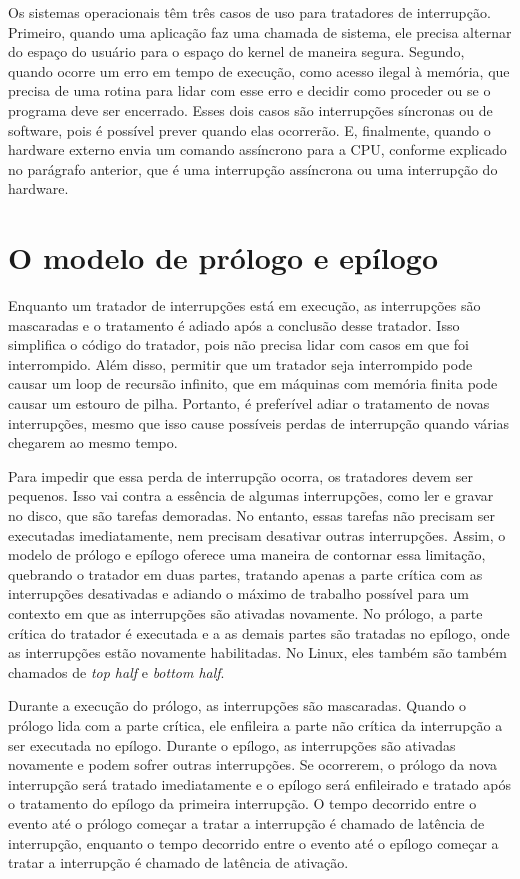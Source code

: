 Os sistemas operacionais têm três casos de uso para tratadores de interrupção. Primeiro, quando uma aplicação faz uma chamada de sistema, ele precisa alternar do espaço do usuário para o espaço do kernel de maneira segura. Segundo, quando ocorre um erro em tempo de execução, como acesso ilegal à memória, que precisa de uma rotina para lidar com esse erro e decidir como proceder ou se o programa deve ser encerrado. Esses dois casos são interrupções síncronas ou de software, pois é possível prever quando elas ocorrerão. E, finalmente, quando o hardware externo envia um comando assíncrono para a CPU, conforme explicado no parágrafo anterior, que é uma interrupção assíncrona ou uma interrupção do hardware. \cite{LinuxInterrupts}

\section{O modelo de prólogo e epílogo}

Enquanto um tratador de interrupções está em execução, as interrupções são mascaradas e o tratamento é adiado após a conclusão desse tratador. Isso simplifica o código do tratador, pois não precisa lidar com casos em que foi interrompido. Além disso, permitir que um tratador seja interrompido pode causar um loop de recursão infinito, que em máquinas com memória finita pode causar um estouro de pilha. Portanto, é preferível adiar o tratamento de novas interrupções, mesmo que isso cause possíveis perdas de interrupção quando várias chegarem ao mesmo tempo.

Para impedir que essa perda de interrupção ocorra, os tratadores devem ser pequenos. Isso vai contra a essência de algumas interrupções, como ler e gravar no disco, que são tarefas demoradas. No entanto, essas tarefas não precisam ser executadas imediatamente, nem precisam desativar outras interrupções. Assim, o modelo de prólogo e epílogo oferece uma maneira de contornar essa limitação, quebrando o tratador em duas partes, tratando apenas a parte crítica com as interrupções desativadas e adiando o máximo de trabalho possível para um contexto em que as interrupções são ativadas novamente. No prólogo, a parte crítica do tratador é executada e a as demais partes são tratadas no epílogo, onde as interrupções estão novamente habilitadas. No Linux, eles também são também chamados de \textit{top half} e \textit{bottom half}. \cite{OReilly}

Durante a execução do prólogo, as interrupções são mascaradas. Quando o prólogo lida com a parte crítica, ele enfileira a parte não crítica da interrupção a ser executada no epílogo. Durante o epílogo, as interrupções são ativadas novamente e podem sofrer outras interrupções. Se ocorrerem, o prólogo da nova interrupção será tratado imediatamente e o epílogo será enfileirado e tratado após o tratamento do epílogo da primeira interrupção. O tempo decorrido entre o evento até o prólogo começar a tratar a interrupção é chamado de latência de interrupção, enquanto o tempo decorrido entre o evento até o epílogo começar a tratar a interrupção é chamado de latência de ativação.

